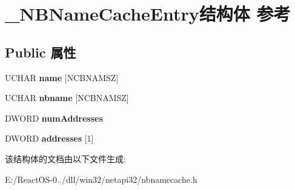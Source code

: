 \hypertarget{struct___n_b_name_cache_entry}{}\section{\+\_\+\+N\+B\+Name\+Cache\+Entry结构体 参考}
\label{struct___n_b_name_cache_entry}
\subsection*{Public 属性}
\begin{DoxyCompactItemize}
\item 
\mbox{\label{struct___n_b_name_cache_entry_a630a88e0dcb4d281f1b6b02155c4fe3d}} 
U\+C\+H\+AR {\bfseries name} \mbox{[}N\+C\+B\+N\+A\+M\+SZ\mbox{]}
\item 
\mbox{\label{struct___n_b_name_cache_entry_a49fb2d787c16af8cdafab2b998674ba8}} 
U\+C\+H\+AR {\bfseries nbname} \mbox{[}N\+C\+B\+N\+A\+M\+SZ\mbox{]}
\item 
\mbox{\label{struct___n_b_name_cache_entry_a3c5f16c0b4a305af0a3c9709e25014ba}} 
D\+W\+O\+RD {\bfseries num\+Addresses}
\item 
\mbox{\label{struct___n_b_name_cache_entry_a8a1fd5e799539c200541963bce7ce177}} 
D\+W\+O\+RD {\bfseries addresses} \mbox{[}1\mbox{]}
\end{DoxyCompactItemize}


该结构体的文档由以下文件生成\+:\begin{DoxyCompactItemize}
\item 
E\+:/\+React\+O\+S-\/0../dll/win32/netapi32/nbnamecache.\+h\end{DoxyCompactItemize}
